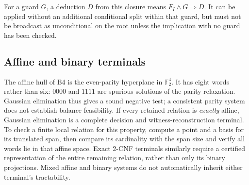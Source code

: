 \documentclass[11pt,letterpaper]{article}
\theoremstyle{definition}
\newcommand{\Ftwo}{\mathbb F_2}
\begin{document}
For a guard \(G\), a deduction \(D\) from this closure means \(F_I\land G\Rightarrow D\). It can be applied without an additional conditional split within that guard, but must not be broadcast as unconditional on the root unless the implication with no guard has been checked.

\subsection{Affine and binary terminals}
The affine hull of B4 is the even-parity hyperplane in \(\Ftwo^4\). It has eight words rather than six: \(0000\) and \(1111\) are spurious solutions of the parity relaxation. Gaussian elimination thus gives a sound negative test; a consistent parity system does not establish balance feasibility. If every retained relation is \emph{exactly} affine, Gaussian elimination is a complete decision and witness-reconstruction terminal. To check a finite local relation for this property, compute a point and a basis for its translated span, then compare its cardinality with the span size and verify all words lie in that affine space. Exact 2-CNF terminals similarly require a certified representation of the entire remaining relation, rather than only its binary projections. Mixed affine and binary systems do not automatically inherit either terminal's tractability.
\end{document}
